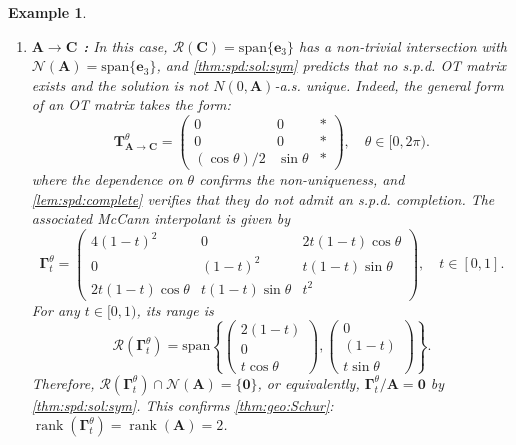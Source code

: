 \documentclass[noinfoline]{imsart}\setcounter{tocdepth}{2}
\newcommand{\m}[1]{\mathbf{#1}} %
\renewcommand{\c}[1]{\mathcal{#1}} %
\DeclareMathOperator*{\rk}{rank}
\theoremstyle{plain}
\newtheorem{example}{Example}[section]
\begin{document}
\begin{example}
\begin{enumerate}[leftmargin = *]
\item \textbf{$\m{A} \to \m{C}$ :} In this case, $\c{R}(\m{C}) = \mathrm{span}\{\m{e}_{3}\}$ has a non-trivial intersection with $\c{N}(\m{A}) = \mathrm{span}\{\m{e}_{3}\}$, and \cref{thm:spd:sol:sym} predicts that no s.p.d. OT matrix exists and the solution is not $N(0, \m{A})$-a.s. unique. Indeed, the general form of an OT matrix takes the form:
\begin{equation*}
    \m{T}_{\m{A} \to \m{C}}^{\theta} = \begin{pmatrix}
    0 & 0 & * \\
    0 & 0 & * \\
    (\cos \theta)/2 & \sin \theta & *
    \end{pmatrix}, \quad \theta \in [0, 2 \pi).
\end{equation*}
where the dependence on $\theta$ confirms the non-uniqueness, and \cref{lem:spd:complete} verifies that they do not admit an s.p.d. completion. 
The associated McCann interpolant is given by
\begin{equation*}
    \m{\Gamma}_{t}^{\theta} = \begin{pmatrix}
    4(1-t)^{2} & 0 & 2t (1-t) \cos \theta  \\
    0 & (1-t)^{2} & t (1-t) \sin \theta \\
    2t (1-t) \cos \theta & t (1-t) \sin \theta & t^{2}
    \end{pmatrix}, \quad t \in [0, 1].
\end{equation*}
For any $t \in [0, 1)$, its range is
\begin{equation*}
    \c{R}(\m{\Gamma}_{t}^{\theta}) = \mathrm{span} \left\{ 
    \begin{pmatrix}
        2(1-t) \\ 0 \\ t \cos \theta
    \end{pmatrix}, \begin{pmatrix}
        0  \\ (1-t) \\ t \sin \theta
    \end{pmatrix} \right\}.
\end{equation*}
Therefore, $\c{R}(\m{\Gamma}_{t}^{\theta}) \cap \c{N}(\m{A}) = \{\m{0}\}$, or equivalently, $\m{\Gamma}_{t}^{\theta}/\m{A} = \m{0}$ by \cref{thm:spd:sol:sym}. This confirms \cref{thm:geo:Schur}: $\rk(\m{\Gamma}_{t}^{\theta}) = \rk (\m{A}) = 2$.
\end{enumerate}
\end{example}
\end{document}
